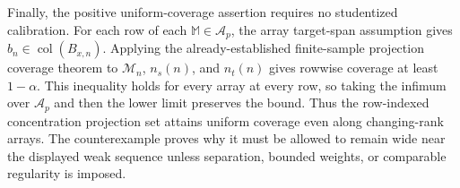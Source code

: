 Finally, the positive uniform-coverage assertion requires no studentized calibration. For each row of each \(\mathbb M\in\mathcal A_p\), the array target-span assumption gives \(b_n\in\operatorname{col}(B_{x,n})\). Applying the already-established finite-sample projection coverage theorem to \(\mathcal M_n\), \(n_s(n)\), and \(n_t(n)\) gives rowwise coverage at least \(1-\alpha\). This inequality holds for every array at every row, so taking the infimum over \(\mathcal A_p\) and then the lower limit preserves the bound. Thus the row-indexed concentration projection set attains uniform coverage even along changing-rank arrays. The counterexample proves why it must be allowed to remain wide near the displayed weak sequence unless separation, bounded weights, or comparable regularity is imposed.